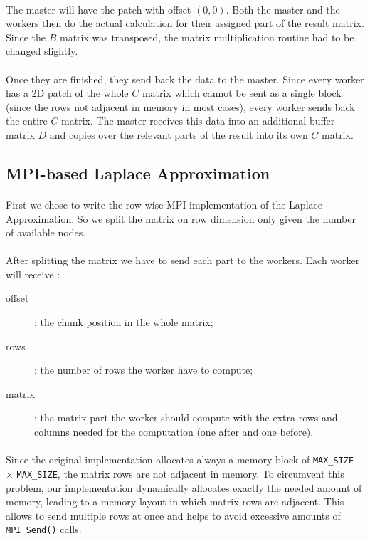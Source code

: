 \documentclass[]{article}
\begin{document}
\paragraph{} The master will have the patch with offset $(0, 0)$. Both the master and the workers then do the actual calculation for their assigned part of the result matrix. Since the $B$ matrix was transposed, the matrix multiplication routine had to be changed slightly.

\paragraph{} Once they are finished, they send back the data to the master. Since every worker has a 2D patch of the whole $C$ matrix which cannot be sent as a single block (since the rows not adjacent in memory in most cases), every worker sends back the entire $C$ matrix. The master receives this data into an additional buffer matrix $D$ and copies over the relevant parts of the result into its own $C$ matrix.

\subsection{MPI-based Laplace Approximation}

\paragraph{} First we chose to write the row-wise MPI-implementation of the Laplace Approximation. So we split the matrix on row dimension only given the number of available nodes.
\paragraph{} After splitting the matrix we have to send each part to the workers. Each worker will receive : 
\begin{description}
	\item[offset]: the chunk position in the whole matrix; 
	\item[rows]: the number of rows the worker have to compute;
	\item[matrix]: the matrix part the worker should compute with the extra rows and columns needed for the computation (one after and one before). 
\end{description}

\paragraph{} Since the original implementation allocates always a memory block of \texttt{MAX\_SIZE} $\times$ \texttt{MAX\_SIZE}, the matrix rows are not adjacent in memory. To circumvent this problem, our implementation dynamically allocates exactly the needed amount of memory, leading to a memory layout in which matrix rows are adjacent. This allows to send multiple rows at once and helps to avoid excessive amounts of \texttt{MPI\_Send()} calls.
\end{document}
